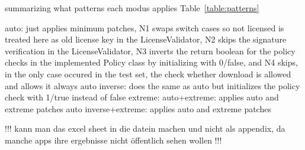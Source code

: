 summarizing what patterns each modus applies Table~\ref{table:patterns}


auto: just applies minimum patches, N1 swaps switch cases so not licensed is treated here as old license key in the LicenseValidator, N2 skips the signature verification in the LicenseValidator, N3 inverts the return boolean for the policy checks in the implemented Policy class by initializing with 0/false, and N4 skips, in the only case occured in the test set, the check whether download is allowed and allows it always
auto inverse: does the same as auto but initializes the policy check with 1/true instead of false
extreme:
auto+extreme: applies auto and extreme patches
auto inverse+extreme: applies auto and extreme patches




!!! kann man das excel sheet in die datein machen und nicht als appendix, da manche apps ihre ergebnisse nicht öffentlich sehen wollen !!!
